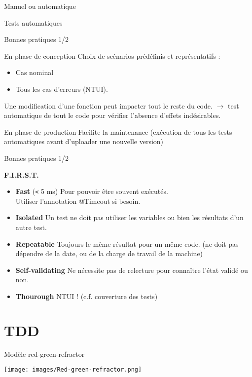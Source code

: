\documentclass[a4paper]{beamer}
\begin{document}
{\begin{frame}{Manuel ou automatique}
\begin{block}{Tests automatiques}
	\end{block}
\end{frame}



\begin{frame}{Bonnes pratiques 1/2}
	
	\begin{block}{En phase de conception}
		Choix de scénarios prédéfinis et représentatifs :
		\begin{itemize}
			\item Cas nominal
			\item Tous les cas d'erreurs (NTUI).\\
		\end{itemize}
		Une modification d'une fonction peut impacter tout le reste du code. $\rightarrow$ test automatique de tout le code pour vérifier l'absence d'effets indésirables.
	\end{block}
	
	\begin{block}{En phase de production}
		Facilite la maintenance (exécution de tous les tests automatiques avant d'uploader une nouvelle version)
	\end{block}
\end{frame}

\begin{frame}{Bonnes pratiques 1/2}
\begin{block}{\textbf{F.I.R.S.T.}}
\begin{itemize}
\item \textbf{Fast} (\texttt{<} 5 ms) Pour pouvoir être souvent exécutés.\\
Utiliser l'annotation @Timeout si besoin.
\item \textbf{Isolated} Un test ne doit pas utiliser les variables ou bien les résultats d'un autre test.
\item \textbf{Repeatable} Toujours le même résultat pour un même code. (ne doit pas dépendre de la date, ou de la charge de travail de la machine)
\item \textbf{Self-validating} Ne nécessite pas de relecture pour connaître l'état validé ou non.
\item \textbf{Thourough} NTUI ! \tiny{(c.f. couverture des tests)}
\end{itemize}
\end{block}
\end{frame}

\section{TDD}
\begin{frame}{Modèle red-green-refractor}
  \begin{center}
  \texttt{[image: images/Red-green-refractor.png]}
  \end{center}
	

\end{frame}}
\end{document}

